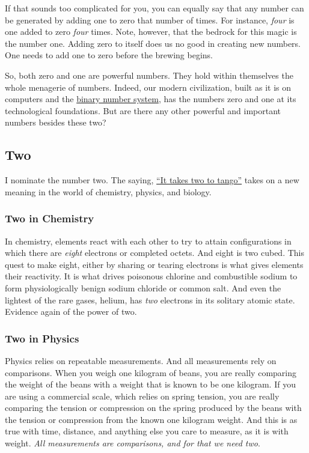 \documentclass[
  a4paper,
]{article}
\begin{document}
If that sounds too complicated for you, you can equally say that any
number can be generated by adding one to zero that number of times. For
instance, \emph{four} is one added to zero \emph{four} times. Note,
however, that the bedrock for this magic is the number one. Adding zero
to itself does us no good in creating new numbers. One needs to add one
to zero before the brewing begins.

So, both zero and one are powerful numbers. They hold within themselves
the whole menagerie of numbers. Indeed, our modern civilization, built
as it is on computers and the
\href{https://www.britannica.com/science/binary-number-system}{binary
number system}, has the numbers zero and one at its technological
foundations. But are there any other powerful and important numbers
besides these two?

\hypertarget{two}{%
\subsection{Two}\label{two}}

I nominate the number two. The saying,
\href{https://dictionary.cambridge.org/dictionary/english/it-takes-two-to-tango}{``It
takes two to tango''} takes on a new meaning in the world of chemistry,
physics, and biology.

\hypertarget{two-in-chemistry}{%
\subsubsection{Two in Chemistry}\label{two-in-chemistry}}

In chemistry, elements react with each other to try to attain
configurations in which there are \emph{eight} electrons or completed
octets. And eight is two cubed. This quest to make eight, either by
sharing or tearing electrons is what gives elements their reactivity. It
is what drives poisonous chlorine and combustible sodium to form
physiologically benign sodium chloride or common salt. And even the
lightest of the rare gases, helium, has \emph{two} electrons in its
solitary atomic state. Evidence again of the power of two.

\hypertarget{two-in-physics}{%
\subsubsection{Two in Physics}\label{two-in-physics}}

Physics relies on repeatable measurements. And all measurements rely on
comparisons. When you weigh one kilogram of beans, you are really
comparing the weight of the beans with a weight that is known to be one
kilogram. If you are using a commercial scale, which relies on spring
tension, you are really comparing the tension or compression on the
spring produced by the beans with the tension or compression from the
known one kilogram weight. And this is as true with time, distance, and
anything else you care to measure, as it is with weight. \emph{All
measurements are comparisons, and for that we need two}.
\end{document}
